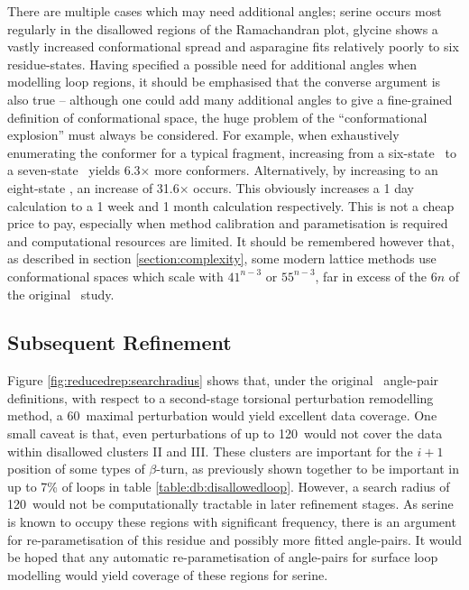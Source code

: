 There are multiple cases which may need additional angles; serine occurs most regularly in the disallowed regions of the Ramachandran plot, glycine shows a vastly increased conformational spread and asparagine fits relatively poorly to  six residue-states.
Having specified a possible  need for additional angles when modelling loop regions, it should be emphasised that the converse argument is also true -- \ie although one could add many additional angles to give a fine-grained definition of conformational space, the huge problem of the ``conformational explosion'' must always be considered. For example, when exhaustively  enumerating the conformer for a typical  fragment, increasing from a six-state \angleset\ to a seven-state \angleset\ yields 6.3$\times$ more conformers. Alternatively, by increasing to an eight-state \angleset, an increase of 31.6$\times$ occurs. This obviously increases a 1 day calculation to a 1 week and 1 month calculation respectively. This is not a cheap price to pay, especially when method calibration and parametisation is required and computational resources are limited. It should be remembered however that, as described in section \ref{section:complexity}, some modern lattice methods use conformational spaces which scale with $41^{n-3}$ or $55^{n-3}$, far in excess of the $6n$ of the original \raft\ study.


\subsection{Subsequent Refinement}
\label{section:reduced_rep:subsequentrefinement}

Figure \ref{fig:reducedrep:searchradius} shows that, under the original \raft\ angle-pair definitions, with respect to a second-stage torsional perturbation remodelling method, a 60\degree\ maximal perturbation would yield excellent data coverage.
One small caveat is that,
even perturbations of up to 120\degree\ would not cover the data within disallowed clusters II and III. These clusters are important for the $i+1$ position of some types of $\beta$-turn, as previously shown together to be important in up to 7\% of loops in table \ref{table:db:disallowedloop}. However, a search radius of 120\degree\ would not be computationally tractable in  later refinement stages.
As serine is known to occupy these regions with significant frequency, there is an argument for re-parametisation of this residue and possibly more fitted angle-pairs. It would be hoped that any automatic re-parametisation of angle-pairs for surface loop modelling would yield coverage of these regions for serine. 

